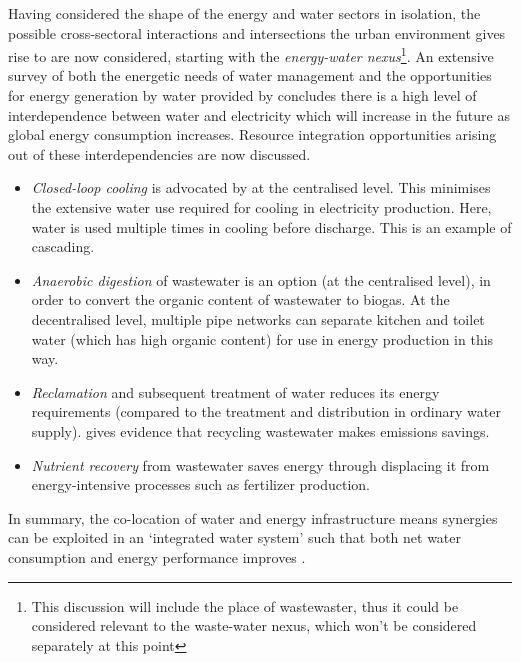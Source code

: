 Having considered the shape of the energy and water sectors in isolation, the possible cross-sectoral interactions and intersections the urban environment gives rise to are now considered, starting with the \emph{energy-water nexus}\footnote{This discussion will include the place of wastewaster, thus it could be considered relevant to the waste-water nexus, which won't be considered separately at this point}. An extensive survey of both the energetic needs of water management and the opportunities for energy generation by water provided by \citep{McMahon2011} concludes there is a high level of interdependence between water and electricity which will increase in the future as global energy consumption increases. Resource integration opportunities arising out of these interdependencies are now discussed.
\begin{itemize}
	\item \emph{Closed-loop cooling} is advocated by \citet{McMahon2011} at the centralised level. This minimises the extensive water use required for cooling in electricity production. Here, water is used multiple times in cooling before discharge. This is an example of cascading.
	\item \emph{Anaerobic digestion} of wastewater is an option (at the centralised level), in order to convert the organic content of wastewater to biogas. At the decentralised level, multiple pipe networks can separate kitchen and toilet water (which has high organic content) for use in energy production in this way.
	\item \emph{Reclamation} and subsequent treatment of water reduces its energy requirements (compared to the treatment and distribution in ordinary water supply). \citet{Lundin2000} gives evidence that recycling wastewater makes emissions savings.
	\item \emph{Nutrient recovery} from wastewater saves energy through displacing it from  energy-intensive processes such as fertilizer production. 
\end{itemize}
In summary, the co-location of water and energy infrastructure means synergies can be exploited in an `integrated water system' such that both net water consumption and energy performance improves \citep{Makropoulos2008}.


